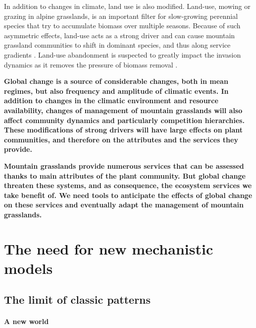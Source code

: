 In addition to changes in climate, land use is also modified.  Land-use, mowing or grazing in alpine grasslands, is an important filter for slow-growing perennial species that try to accumulate biomass over multiple seasons. Because of such asymmetric effects, land-use acts as a strong driver and can cause mountain grassland communities to shift in dominant species, and thus along service gradients \parencite{schirpke_multiple_2013}. Land-use abandonment is suspected to greatly impact the invasion dynamics as it removes the pressure of biomass removal \parencite{carboni_simulating_2018}. 

\textbf{Global change is a source of considerable changes, both in mean regimes, but also frequency and amplitude of climatic events. In addition to changes in the climatic environment and resource availability, changes of management of mountain grasslands will also affect community dynamics and particularly competition hierarchies. These modifications of strong drivers will have large effects on plant communities, and therefore on the attributes and the services they provide.}

\textbf{Mountain grasslands provide numerous services that can be assessed thanks to main attributes of the plant community. But global change threaten these systems, and as consequence, the ecosystem services we take benefit of. We need tools to anticipate the effects of global change on these services and eventually adapt the management of mountain grasslands.}
%
%



 
%
\section{The need for new mechanistic models}


\subsection{The limit of classic patterns}
\paragraph{A new world}


